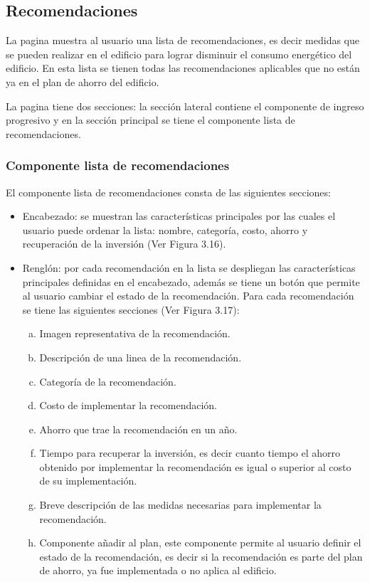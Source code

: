 \subsection{Recomendaciones}
\label{subsec:recomendaciones}

La pagina  muestra al usuario una lista de
recomendaciones, es decir medidas que se pueden realizar en el edificio
para lograr disminuir el consumo energético del edificio. En esta lista se
tienen todas las recomendaciones aplicables que no están ya en el plan
de ahorro del edificio.

La pagina tiene dos secciones: la sección lateral contiene el componente de
ingreso progresivo y en la sección principal se tiene el componente lista
de recomendaciones.

\subsubsection{Componente lista de recomendaciones}

El componente lista de recomendaciones consta de las siguientes secciones:

\begin{itemize}
\item Encabezado: se muestran las características principales por las cuales
  el usuario puede ordenar la lista: nombre, categoría, costo, ahorro y recuperación
  de la inversión (Ver Figura 3.16).
\item Renglón: por cada recomendación en la lista se despliegan las
  características principales definidas en el encabezado, además se tiene un botón
  que permite al usuario cambiar el estado de la recomendación.
  Para cada recomendación se tiene las siguientes secciones (Ver Figura 3.17):
  \begin{enumerate}[a)]
  \item Imagen representativa de la recomendación.
  \item Descripción de una linea de la recomendación.
  \item Categoría de la recomendación.
  \item Costo de implementar la recomendación.
  \item Ahorro que trae la recomendación en un año.
  \item Tiempo para recuperar la inversión, es decir cuanto tiempo el ahorro
    obtenido por implementar la recomendación es igual o superior al costo
    de su implementación.
  \item Breve descripción de las medidas necesarias para implementar la
    recomendación.
  \item Componente añadir al plan, este componente permite al usuario definir el
    estado de la recomendación, es decir si la recomendación es parte
    del plan de ahorro, ya fue implementada o no aplica al edificio.
  \end{enumerate}
\end{itemize}

